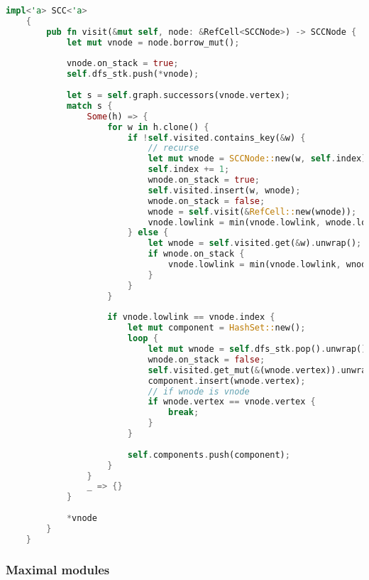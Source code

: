 \begin{lstlisting}[language=Rust, style=rust, caption={Defining the Component Graph}, label={lst:rust-define-visit}, firstnumber=1]
    impl<'a> SCC<'a>
    {
        pub fn visit(&mut self, node: &RefCell<SCCNode>) -> SCCNode {
            let mut vnode = node.borrow_mut();
            
            vnode.on_stack = true;
            self.dfs_stk.push(*vnode);
    
            let s = self.graph.successors(vnode.vertex);
            match s {
                Some(h) => {
                    for w in h.clone() {
                        if !self.visited.contains_key(&w) {
                            // recurse
                            let mut wnode = SCCNode::new(w, self.index);
                            self.index += 1;
                            wnode.on_stack = true;
                            self.visited.insert(w, wnode);
                            wnode.on_stack = false;
                            wnode = self.visit(&RefCell::new(wnode));
                            vnode.lowlink = min(vnode.lowlink, wnode.lowlink);
                        } else {
                            let wnode = self.visited.get(&w).unwrap();
                            if wnode.on_stack {
                                vnode.lowlink = min(vnode.lowlink, wnode.index);
                            }
                        }
                    }
    
                    if vnode.lowlink == vnode.index {
                        let mut component = HashSet::new();
                        loop {
                            let mut wnode = self.dfs_stk.pop().unwrap();
                            wnode.on_stack = false;
                            self.visited.get_mut(&(wnode.vertex)).unwrap().on_stack = false;
                            component.insert(wnode.vertex);
                            // if wnode is vnode
                            if wnode.vertex == vnode.vertex {
                                break;
                            }
                        }
    
                        self.components.push(component);
                    }
                }
                _ => {}
            }
    
            *vnode
        }
    }
\end{lstlisting}

\subsubsection{Maximal modules}

